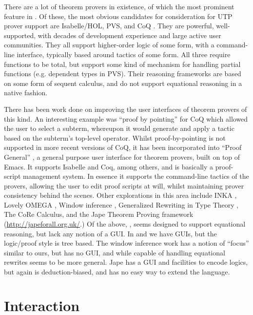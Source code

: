 \documentclass[copyright]{eptcs}
\begin{document}
There are a lot of theorem provers in existence,
of which the most prominent feature in \cite{conf/tphol/2006provers}.
Of these, the most obvious candidates for consideration for UTP prover support
are Isabelle/HOL\cite{books/sp/NipkowPW02},
PVS\cite{conf/fmcad/Shankar96},
and CoQ \cite{bk:Coq'Art:04}.
They are powerful, well-supported,
with decades of development experience
and large active user communities.
They all support higher-order logic of some form, with a command-line interface,
typically based around tactics of some form. All three require functions to be total,
but support some kind of mechanism for handling partial functions
(e.g. dependent types in PVS).
Their reasoning frameworks are based on some form of sequent calculus,
and do not support equational reasoning in a native fashion.

There has been work done on improving the user interfaces
of theorem provers of this kind.
An interesting example was ``proof by pointing'' \cite{conf/tacs/BertotKT94}
for CoQ which allowed the user to select a subterm,
whereupon it would generate and apply a tactic based on the subterm's top-level
operator.
Whilst proof-by-pointing is not supported in more recent versions of CoQ,
it has been incorporated into ``Proof General'' \cite{conf/tacas/Aspinall00},
a general purpose user interface for theorem provers, built on top of Emacs.
It supports Isabelle and Coq, among others,
and is basically a proof-script management system.
In essence it supports the command-line tactics of the provers,
allowing the user to edit proof scripts at will,
whilst maintaining prover consistency behind the scenes.
Other explorations in this area include
INKA \cite{Hutter96}, Lovely OMEGA \cite{oai:CiteSeerXPSU:10.1.1.42.1864},
Window inference \cite{Staples95},
Generalized Rewriting in Type Theory \cite{journals/eik/Basin94},
The CoRe Calculus, \cite{conf/cade/Autexier05}
and the Jape Theorem Proving framework (\url{http://japeforall.org.uk/}.)
Of the above, \cite{conf/cade/Autexier05},\cite{journals/eik/Basin94} seems designed
to support equational reasoning, but lack any notion of a GUI. In \cite{Hutter96} and \cite{oai:CiteSeerXPSU:10.1.1.42.1864} we have GUIs, but the logic/proof style is tree based.
The window inference work \cite{Staples95} has a notion of ``focus'' similar to ours,
but has no GUI, and while capable of handling equational rewrites seems to be more general.
Jape has a GUI and facilities to encode logics, but again is deduction-biased, and has no easy
way to extend the language.

\section{Interaction}\label{sec:interact}
\end{document}

